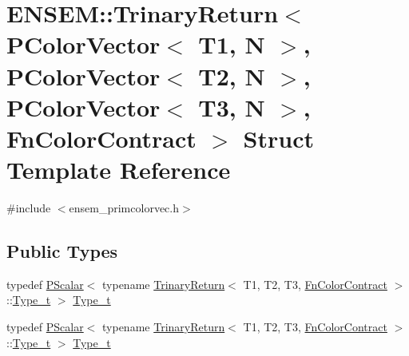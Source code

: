 \hypertarget{structENSEM_1_1TrinaryReturn_3_01PColorVector_3_01T1_00_01N_01_4_00_01PColorVector_3_01T2_00_01N4ce572db3e48fe7214a7d25b458894fc}{}\section{E\+N\+S\+EM\+:\+:Trinary\+Return$<$ P\+Color\+Vector$<$ T1, N $>$, P\+Color\+Vector$<$ T2, N $>$, P\+Color\+Vector$<$ T3, N $>$, Fn\+Color\+Contract $>$ Struct Template Reference}
\label{structENSEM_1_1TrinaryReturn_3_01PColorVector_3_01T1_00_01N_01_4_00_01PColorVector_3_01T2_00_01N4ce572db3e48fe7214a7d25b458894fc}


{\ttfamily \#include $<$ensem\+\_\+primcolorvec.\+h$>$}

\subsection*{Public Types}
\begin{DoxyCompactItemize}
\item 
typedef \mbox{\hyperlink{classENSEM_1_1PScalar}{P\+Scalar}}$<$ typename \mbox{\hyperlink{structENSEM_1_1TrinaryReturn}{Trinary\+Return}}$<$ T1, T2, T3, \mbox{\hyperlink{structENSEM_1_1FnColorContract}{Fn\+Color\+Contract}} $>$\+::\mbox{\hyperlink{structENSEM_1_1TrinaryReturn_3_01PColorVector_3_01T1_00_01N_01_4_00_01PColorVector_3_01T2_00_01N4ce572db3e48fe7214a7d25b458894fc_a5776e82d03d9b207eec13d0bb0a9b447}{Type\+\_\+t}} $>$ \mbox{\hyperlink{structENSEM_1_1TrinaryReturn_3_01PColorVector_3_01T1_00_01N_01_4_00_01PColorVector_3_01T2_00_01N4ce572db3e48fe7214a7d25b458894fc_a5776e82d03d9b207eec13d0bb0a9b447}{Type\+\_\+t}}
\item 
typedef \mbox{\hyperlink{classENSEM_1_1PScalar}{P\+Scalar}}$<$ typename \mbox{\hyperlink{structENSEM_1_1TrinaryReturn}{Trinary\+Return}}$<$ T1, T2, T3, \mbox{\hyperlink{structENSEM_1_1FnColorContract}{Fn\+Color\+Contract}} $>$\+::\mbox{\hyperlink{structENSEM_1_1TrinaryReturn_3_01PColorVector_3_01T1_00_01N_01_4_00_01PColorVector_3_01T2_00_01N4ce572db3e48fe7214a7d25b458894fc_a5776e82d03d9b207eec13d0bb0a9b447}{Type\+\_\+t}} $>$ \mbox{\hyperlink{structENSEM_1_1TrinaryReturn_3_01PColorVector_3_01T1_00_01N_01_4_00_01PColorVector_3_01T2_00_01N4ce572db3e48fe7214a7d25b458894fc_a5776e82d03d9b207eec13d0bb0a9b447}{Type\+\_\+t}}
\end{DoxyCompactItemize}



